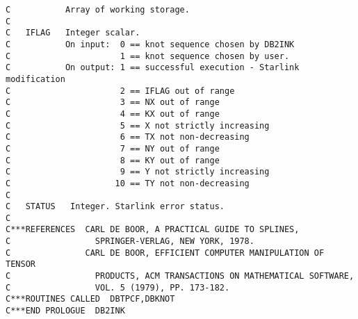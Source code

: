 \begin{verbatim}
C           Array of working storage.
C
C   IFLAG   Integer scalar.
C           On input:  0 == knot sequence chosen by DB2INK
C                      1 == knot sequence chosen by user.
C           On output: 1 == successful execution - Starlink modification
C                      2 == IFLAG out of range
C                      3 == NX out of range
C                      4 == KX out of range
C                      5 == X not strictly increasing
C                      6 == TX not non-decreasing
C                      7 == NY out of range
C                      8 == KY out of range
C                      9 == Y not strictly increasing
C                     10 == TY not non-decreasing
C    
C   STATUS   Integer. Starlink error status. 
C  
C***REFERENCES  CARL DE BOOR, A PRACTICAL GUIDE TO SPLINES,
C                 SPRINGER-VERLAG, NEW YORK, 1978.
C               CARL DE BOOR, EFFICIENT COMPUTER MANIPULATION OF TENSOR
C                 PRODUCTS, ACM TRANSACTIONS ON MATHEMATICAL SOFTWARE,
C                 VOL. 5 (1979), PP. 173-182.
C***ROUTINES CALLED  DBTPCF,DBKNOT
C***END PROLOGUE  DB2INK
\end{verbatim}


